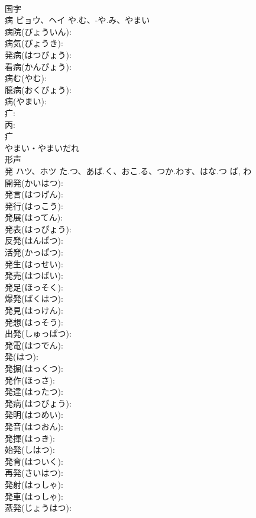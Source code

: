 \documentclass[8pt]{extreport}
\begin{document}
\begin{CJK}{UTF8}{min}
\\	国字 
\\	病	ビョウ、ヘイ	や.む、-や.み、やまい		
\\	病院(びょういん): 
\\	病気(びょうき): 
\\	発病(はつびょう): 
\\	看病(かんびょう): 
\\	病む(やむ): 
\\	臆病(おくびょう): 
\\	病(やまい): 
\\	疒: 
\\	丙: 
\\	疒	
\\	やまい・やまいだれ	
\\	形声 
\\	発	ハツ、ホツ	た.つ、あば.く、おこ.る、つか.わす、はな.つ	ば, わ	
\\	開発(かいはつ): 
\\	発言(はつげん): 
\\	発行(はっこう): 
\\	発展(はってん): 
\\	発表(はっぴょう): 
\\	反発(はんぱつ): 
\\	活発(かっぱつ): 
\\	発生(はっせい): 
\\	発売(はつばい): 
\\	発足(ほっそく): 
\\	爆発(ばくはつ): 
\\	発見(はっけん): 
\\	発想(はっそう): 
\\	出発(しゅっぱつ): 
\\	発電(はつでん): 
\\	発(はつ): 
\\	発掘(はっくつ): 
\\	発作(ほっさ): 
\\	発達(はったつ): 
\\	発病(はつびょう): 
\\	発明(はつめい): 
\\	発音(はつおん): 
\\	発揮(はっき): 
\\	始発(しはつ): 
\\	発育(はついく): 
\\	再発(さいはつ): 
\\	発射(はっしゃ): 
\\	発車(はっしゃ): 
\\	蒸発(じょうはつ): 

\end{CJK}
\end{document}
